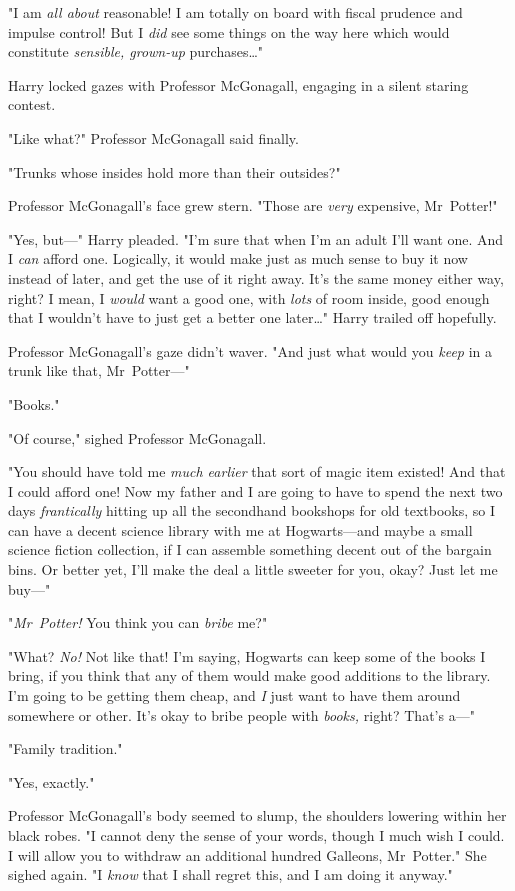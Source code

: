 "I am \emph{all about} reasonable! I am totally on board with fiscal prudence
and impulse control! But I \emph{did} see some things on the way here which
would constitute \emph{sensible, grown-up} purchases…"

Harry locked gazes with Professor McGonagall, engaging in a silent staring
contest.

"Like what?" Professor McGonagall said finally.

"Trunks whose insides hold more than their outsides?"

Professor McGonagall's face grew stern. "Those are \emph{very} expensive,
Mr~Potter!"

"Yes, but---" Harry pleaded. "I'm sure that when I'm an adult I'll want one.
And I \emph{can} afford one. Logically, it would make just as much sense to buy
it now instead of later, and get the use of it right away. It's the same money
either way, right? I mean, I \emph{would} want a good one, with \emph{lots} of
room inside, good enough that I wouldn't have to just get a better one
later…" Harry trailed off hopefully.

Professor McGonagall's gaze didn't waver. "And just what would you \emph{keep}
in a trunk like that, Mr~Potter---"

"Books."

"Of course," sighed Professor McGonagall.

"You should have told me \emph{much earlier} that sort of magic item existed!
And that I could afford one! Now my father and I are going to have to spend the
next two days \emph{frantically} hitting up all the secondhand bookshops for
old textbooks, so I can have a decent science library with me at Hogwarts---and
maybe a small science fiction collection, if I can assemble something decent
out of the bargain bins. Or better yet, I'll make the deal a little sweeter for
you, okay? Just let me buy---"

"\emph{Mr~Potter!} You think you can \emph{bribe} me?"

"What? \emph{No!} Not like that! I'm saying, Hogwarts can keep some of the
books I bring, if you think that any of them would make good additions to the
library. I'm going to be getting them cheap, and \emph{I} just want to have
them around somewhere or other. It's okay to bribe people with \emph{books,}
right? That's a---"

"Family tradition."

"Yes, exactly."

Professor McGonagall's body seemed to slump, the shoulders lowering within her
black robes. "I cannot deny the sense of your words, though I much wish I
could. I will allow you to withdraw an additional hundred Galleons,
Mr~Potter." She sighed again. "I \emph{know} that I shall regret this, and I
am doing it anyway."


